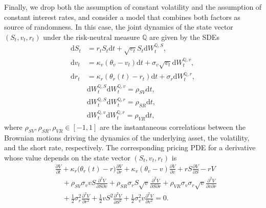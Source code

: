 \documentclass[12pt]{report} %
\theoremstyle{plain} %
\theoremstyle{definition} %
\theoremstyle{remark} %
\begin{document}
Finally, we drop both the assumption of constant volatility and the
assumption of constant interest rates, and consider a model that combines
both factors as source of randomness. In this case, the joint dynamics of the state vector
\((S_t, v_t, r_t)\) under the risk-neutral measure $\mathbb{Q}$ are given by the SDEs
\begin{equation}\label{eq:sv_rates_sde}
\begin{aligned}
 \mathrm{d}S_t &= r_t S_t\mathrm{d}t
				+ \sqrt{v_t}S_t\mathrm{d}W_t^{\mathbb{Q},S},\\
 \mathrm{d}v_t &= \kappa_v(\theta_v-v_t)\mathrm{d}t
				+ \sigma_v\sqrt{v_t}\mathrm{d}W_t^{\mathbb{Q},v},\\
 \mathrm{d}r_t &= \kappa_r(\theta_{r}(t)-r_t)\mathrm{d}t
				+ \sigma_r\mathrm{d}W_t^{\mathbb{Q},r},\\
 &\mathrm{d}W_t^{\mathbb{Q},S}\mathrm{d}W_t^{\mathbb{Q},v}
				=\rho_{SV}\mathrm{d}t,\\
 &\mathrm{d}W_t^{\mathbb{Q},S}\mathrm{d}W_t^{\mathbb{Q},r}
				=\rho_{SR}\mathrm{d}t,\\
 &\mathrm{d}W_t^{\mathbb{Q},v}\mathrm{d}W_t^{\mathbb{Q},r}
				=\rho_{VR}\mathrm{d}t,
\end{aligned}
\end{equation}
where \(\rho_{SV},\rho_{SR},\rho_{VR}\in[-1,1]\) are the instantaneous correlations between the
Brownian motions driving the dynamics of the underlying asset, the volatility, and the short rate, respectively.
The corresponding pricing PDE for a derivative whose value depends on the state vector \((S_t, v_t, r_t)\) is
\begin{equation}\label{eq:sv_rates_pde}
\begin{aligned}
	&\frac{\partial V}{\partial t}
	+ \kappa_r\bigl(\theta_r(t)-r\bigr)\frac{\partial V}{\partial r}
	+ \kappa_v(\theta_v-v)\frac{\partial V}{\partial v}
	+ r S\frac{\partial V}{\partial S}
	- r V \\[6pt]
	&\quad
	 + \rho_{SV}\sigma_{v}v S\frac{\partial^{2} V}{\partial S\partial v}
	 + \rho_{SR}\sigma_{r}S\sqrt{v}\frac{\partial^{2} V}{\partial S\partial r}
	 + \rho_{VR}\sigma_{v}\sigma_{r}\sqrt{v}\frac{\partial^{2} V}{\partial v\partial r} \\[6pt]
	&\quad
	 + \frac12\sigma_r^{2}\frac{\partial^{2} V}{\partial r^{2}}
	 + \frac12 v S^{2}\frac{\partial^{2} V}{\partial S^{2}}
	 + \frac12\sigma_{v}^{2} v\frac{\partial^{2} V}{\partial v^{2}}
	= 0.
\end{aligned}
\end{equation}
\end{document}
